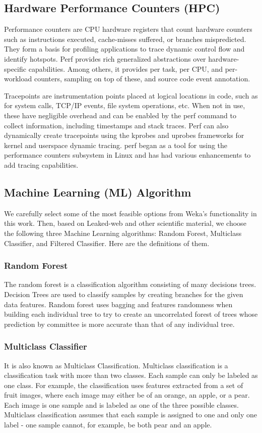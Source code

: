 \documentclass[conference]{IEEEtran}
\begin{document}
\subsection{Hardware Performance Counters (HPC)}
Performance counters are CPU hardware registers that count hardware counters such as instructions executed, cache-misses suffered, or branches mispredicted. They form a basis for profiling applications to trace dynamic control flow and identify hotspots. Perf provides rich generalized abstractions over hardware-specific capabilities. Among others, it provides per task, per CPU, and per-workload counters, sampling on top of these, and source code event annotation.

Tracepoints are instrumentation points placed at logical locations in code, such as for system calls, TCP/IP events, file system operations, etc. When not in use, these have negligible overhead and can be enabled by the perf command to collect information, including timestamps and stack traces. Perf can also dynamically create tracepoints using the kprobes and uprobes frameworks for kernel and userspace dynamic tracing. perf began as a tool for using the performance counters subsystem in Linux and has had various enhancements to add tracing capabilities. \cite{b2}

\subsection{Machine Learning (ML) Algorithm}
We carefully select some of the most feasible options from Weka's functionality in this work. Then, based on Leaked-web and other scientific material, we choose the following three Machine Learning algorithms: Random Forest, Multiclass Classifier, and Filtered Classifier. Here are the definitions of them.

\subsubsection{Random Forest} The random forest is a classification algorithm consisting of many decisions trees. Decision Trees are used to classify samples by creating branches for the given data features. Random forest uses bagging and features randomness when building each individual tree to try to create an uncorrelated forest of trees whose prediction by committee is more accurate than that of any individual tree.

\subsubsection{Multiclass Classifier} It is also known as Multiclass Classification. Multiclass classification is a classification task with more than two classes. Each sample can only be labeled as one class. For example, the classification uses features extracted from a set of fruit images, where each image may either be of an orange, an apple, or a pear. Each image is one sample and is labeled as one of the three possible classes. Multiclass classification assumes that each sample is assigned to one and only one label - one sample cannot, for example, be both pear and an apple.
\end{document}
